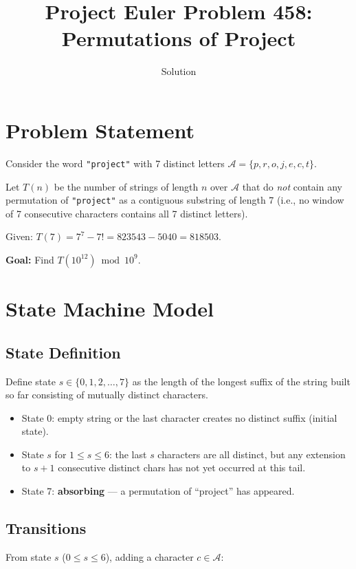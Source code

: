 \documentclass[11pt]{article}
\title{Project Euler Problem 458:\\Permutations of Project}
\author{Solution}
\date{}
\begin{document}
\maketitle

\section{Problem Statement}

Consider the word \texttt{"project"} with 7 distinct letters $\mathcal{A} = \{p, r, o, j, e, c, t\}$.

Let $T(n)$ be the number of strings of length $n$ over $\mathcal{A}$ that do \emph{not} contain any
permutation of \texttt{"project"} as a contiguous substring of length 7 (i.e., no window of 7
consecutive characters contains all 7 distinct letters).

Given: $T(7) = 7^7 - 7! = 823543 - 5040 = 818503$.

\textbf{Goal:} Find $T(10^{12}) \bmod 10^9$.

\section{State Machine Model}

\subsection{State Definition}

Define state $s \in \{0, 1, 2, \ldots, 7\}$ as the length of the longest suffix of the string
built so far consisting of mutually distinct characters.

\begin{itemize}
    \item State 0: empty string or the last character creates no distinct suffix (initial state).
    \item State $s$ for $1 \le s \le 6$: the last $s$ characters are all distinct,
          but any extension to $s+1$ consecutive distinct chars has not yet occurred at this tail.
    \item State 7: \textbf{absorbing} --- a permutation of ``project'' has appeared.
\end{itemize}

\subsection{Transitions}

From state $s$ ($0 \le s \le 6$), adding a character $c \in \mathcal{A}$:
\end{document}
